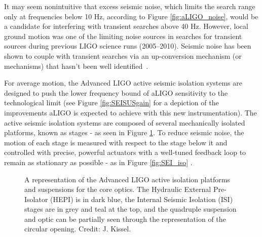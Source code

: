 It may seem nonintuitive that excess seismic noise, which limits the search range only at frequencies below 10 Hz, according to Figure \ref{fig:aLIGO_noise}, would be a candidate for interfering with transient \gw{}  searches above 40 Hz. However, local ground motion was one of the limiting noise sources in searches for transient \gw{}  sources during previous LIGO science runs (2005--2010). Seismic noise has been shown to couple with transient searches via an up-conversion mechanism (or mechanisms) that hasn't been well identified~\cite{Macleod-Seisveto}. 

For average motion, the Advanced LIGO active seismic isolation systems are designed to push the lower frequency bound of aLIGO sensitivity to the technological limit (see Figure \ref{fig:SEISUSgain} for a depiction of the improvements aLIGO is expected to achieve with this new instrumentation). 
The active seismic isolation systems are composed of several mechanically isolated platforms, known as stages - as seen in Figure \ref{fig:BSC_ISI}. To reduce seismic noise, the motion of each stage is measured with respect to the stage below it and controlled with precise, powerful actuators with a well-tuned feedback loop to remain as stationary as possible - as in Figure \ref{fig:SEI_iso} \cite{KisselThesis}. 

\begin{figure}[htb]
	\caption{\label{fig:BSC_ISI} A representation of the Advanced LIGO active isolation platforms and suspensions for the core optics. The Hydraulic External Pre-Isolator (HEPI) is in dark blue, the Internal Seismic Isolation (ISI) stages are in grey and teal at the top, and the quadruple suspension and optic can be partially seen through the representation of the circular opening. Credit: J. Kissel.}
\end{figure}

